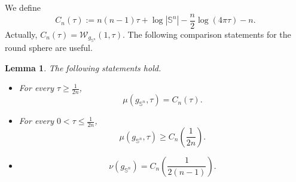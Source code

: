 \documentclass[11pt, reqno]{amsart}
\numberwithin{equation}{section}
\newtheorem{lemma}[theorem]{Lemma}
\theoremstyle{remark}
\newcommand{\Sph}{\mathbb S}
\newcommand{\W}{\mathcal{W}}
\begin{document}
We define
\begin{equation}\label{eq:Cn}
C_n(\tau):=n(n-1)\tau+\log |\Sph^n|-\frac n2\log(4\pi\tau)-n.
\end{equation}
Actually, $C_n(\tau)=\W_{g_{\Sph^n}}(1,\tau)$. The following comparison statements for the round sphere are useful. 
\begin{lemma}\label{lem:sphere-mu}
The following statements hold.
\begin{itemize}
\item[(1)] For every $\tau\geq\frac{1}{2n}$,
\begin{equation}\label{eq:sphere-large}
\mu(g_{\Sph^n},\tau)=C_n(\tau).
\end{equation}
\item[(2)]For every $0<\tau\leq\frac{1}{2n}$,
\begin{equation}\label{eq:sphere-small}
\mu(g_{\Sph^n},\tau)\geq C_n\left(\frac{1}{2n}\right).
\end{equation}
\item[(3)]\begin{equation}\label{eq:sphere-nu}
\nu(g_{\Sph^n})=C_n\left(\frac{1}{2(n-1)}\right).
\end{equation}
\end{itemize}
\end{lemma}
\end{document}
